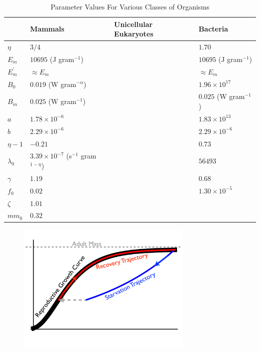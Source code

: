 \documentclass[12pt,english]{article}
\begin{document}
\begin{spacing}{1.9}
%
\clearpage

\begin{table}[h]
\caption{Parameter Values For Various Classes of Organisms}
\label{parameter-values}
    \begin{center}
    \small
     \begin{tabular}{| p{1.2cm}| p{3.2cm} | p{2.6cm} | p{3.2cm} | }
     \hline
     & {\bf Mammals} & {\bf Unicellular Eukaryotes} & {\bf Bacteria} \\
     \hline
   $\eta$ & $3/4$ & & $1.70$ \\ 
   $E_{m}$ & $10695$ (J gram$^{-1}$) & & $10695$ (J gram$^{-1}$) \\ 
   $E_{m}^{\prime}$ & $\approx E_{m}$ & & $\approx E_{m}$ \\ 
   $B_{0}$ & $0.019$ (W gram$^{-\alpha}$) & & $1.96\times10^{17}$ \\
   $B_{m}$ & $0.025$ (W gram$^{-1}$)   & & $0.025$ (W gram$^{-1}$)\\
   $a$ & $1.78\times10^{-6}$ & & $1.83\times10^{13}$ \\ 
   $b$ & $2.29\times10^{-6}$ & & $2.29\times10^{-6}$ \\  
   $\eta-1$ & $-0.21$ & & $0.73$ \\ 
   $\lambda_{0}$ & $3.39\times10^{-7}$ (s$^{-1}$ gram$^{1-\eta}$) & & $56493$ \\ 
   $\gamma$ & $1.19$ & & $0.68$ \\ 
   $f_{0}$ & $0.02$ & & $1.30\times10^{-5}$ \\ 
   $\zeta$ & $1.01$ & & \\ 
   $mm_{0}$ & $0.32$ & & \\ 
   
      
   \hline
    \end{tabular}
    \end{center}
   \end{table}

\clearpage

 \begin{figure}[h]
 	\centering
 	\includegraphics[width=0.75\textwidth]{Growth-trajectory-diagram.pdf}
 	\caption{
 	}
 	\label{growth-diagram}
 \end{figure}


\end{spacing}
\end{document}
